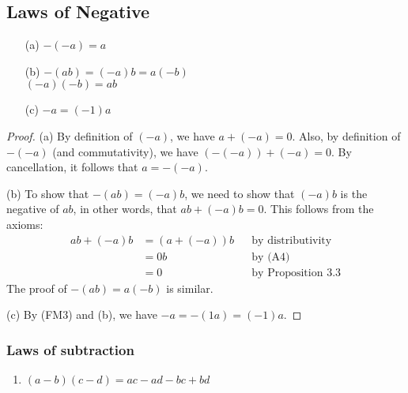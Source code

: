 \documentclass[11pt]{article}
\begin{document}
    \subsection{Laws of Negative}
    \begin{enumerate}
        \item[(a)] \(-(-a) = a\) 
        \item[(b)] \(-(ab) = (-a)b = a(-b)\) \\ \((-a)(-b)=ab\)
        \item[(c)] \(-a = (-1)a\)
    \end{enumerate}
    \begin{proof}
        (a) By definition of \((-a)\), we have \(a + (-a) = 0.\) Also, by definition of \(-(-a)\) (and commutativity), we have \((-(-a)) + (-a) = 0\). By cancellation, it follows that \(a = -(-a).\)

        (b) To show that \(-(ab) = (-a)b\), we need to show that \((-a)b\) is the negative of \(ab\), in other words, that \(ab + (-a)b = 0\). This follows from the axioms:
        \begin{align*}
            ab + (-a)b &= (a + (-a))b && \text{by distributivity}  \\
                       &= 0b          && \text{by (A4)}            \\
                       &= 0           && \text{by Proposition 3.3}
        \end{align*}
        The proof of \(-(ab) = a(-b)\) is similar.

        (c) By (FM3) and (b), we have \(-a = -(1a) = (-1)a.\)
    \end{proof}

    \subsubsection{Laws of subtraction}
    \begin{enumerate}
        \item \((a-b)(c-d) = ac - ad - bc + bd\)
    \end{enumerate}
\end{document}
